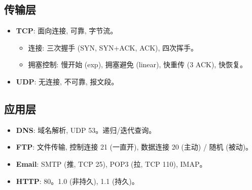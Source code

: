 \documentclass[cn,hazy,blue,12pt,screen,normal]{elegantnote}
\begin{document}
\subsection{传输层}
\begin{itemize}
    \item \textbf{TCP}: 面向连接, 可靠, 字节流。
    \begin{itemize}
        \item 连接: 三次握手 (SYN, SYN+ACK, ACK), 四次挥手。
        \item 拥塞控制: 慢开始 (exp), 拥塞避免 (linear), 快重传 (3 ACK), 快恢复。
    \end{itemize}
    \item \textbf{UDP}: 无连接, 不可靠, 报文段。
\end{itemize}

\subsection{应用层}
\begin{itemize}
    \item \textbf{DNS}: 域名解析, UDP 53。递归/迭代查询。
    \item \textbf{FTP}: 文件传输, 控制连接 21 (一直开), 数据连接 20 (主动) / 随机 (被动)。
    \item \textbf{Email}: SMTP (推, TCP 25), POP3 (拉, TCP 110), IMAP。
    \item \textbf{HTTP}: 80。1.0 (非持久), 1.1 (持久)。
\end{itemize}
\end{document}

